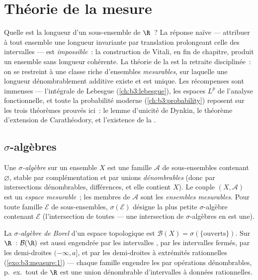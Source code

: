 \chapter{Théorie de la mesure}\label{ch:b3:measure}

Quelle est la longueur d'un sous-ensemble de $\R$~? La réponse
naïve --- attribuer à tout ensemble une longueur invariante
par translation prolongeant celle des intervalles --- est
\emph{impossible}~: la construction de Vitali, en fin de
chapitre, produit un ensemble sans longueur cohérente. La
théorie de la  est la retraite disciplinée~: on se
restreint à une classe riche d'ensembles \emph{mesurables},
sur laquelle une longueur dénombrablement additive existe et
est unique. Les récompenses sont immenses --- l'intégrale de
Lebesgue (\cref{ch:b3:lebesgue}), les espaces $L^p$ de
l'analyse fonctionnelle, et toute la probabilité moderne
(\cref{ch:b3:probability}) reposent sur les trois théorèmes
prouvés ici~: le lemme d'unicité de Dynkin, le théorème
d'extension de Carathéodory, et l'existence de la .

\section{$\sigma$-algèbres}

\begin{definition}\label{def:b3:measure:sigmaalgebra}
Une \emph{$\sigma$-algèbre}
sur un ensemble $X$ est une famille $\mathcal A$ de
sous-ensembles contenant $\varnothing$, stable par
complémentation et par unions \emph{dénombrables} (donc par
intersections dénombrables, différences, et elle contient
$X$). Le couple $(X, \mathcal A)$ est un \emph{espace
mesurable}~; les membres de $\mathcal A$ sont les
\emph{ensembles mesurables}. Pour toute famille $\mathcal E$
de sous-ensembles, $\sigma(\mathcal E)$ désigne la plus
petite $\sigma$-algèbre contenant $\mathcal E$ (l'intersection
de toutes --- une intersection de $\sigma$-algèbres en est
une).
\end{definition}

\begin{definition}\label{def:b3:measure:borel}
La \emph{$\sigma$-algèbre de Borel} d'un espace
topologique est $\mathcal B(X) = \sigma(\{\text{ouverts}\})$.
Sur $\R$~: $\mathcal B(\R)$ est aussi engendrée par les
intervalles , par les intervalles fermés, par les
demi-droites $(-\infty, a]$, et par les demi-droites à
extrémités rationnelles (\cref{exo:b3:measure:1}) --- chaque
famille engendre les  par opérations dénombrables,
p.~ex.\ tout  de $\R$ est une union dénombrable
d'intervalles  à données rationnelles.
\end{definition}

